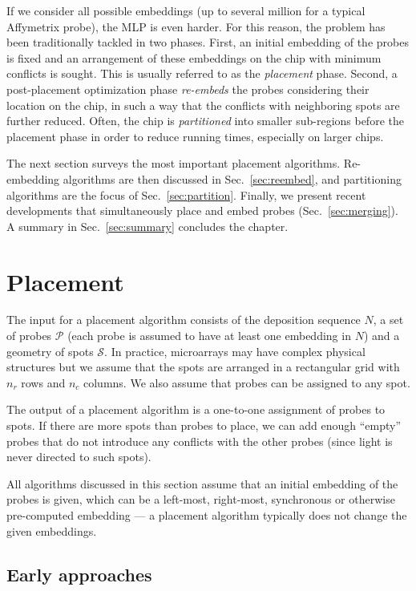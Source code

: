 \documentclass{w-edbk}
\begin{document}
If we consider all possible embeddings (up to several million for a typical
Affymetrix probe), the MLP is even harder. For this reason, the problem has
been traditionally tackled in two phases. First, an initial embedding of the
probes is fixed and an arrangement of these embeddings on the chip with minimum
conflicts is sought. This is usually referred to as the \emph{placement} phase.
Second, a post-placement optimization phase \emph{re-embeds} the probes
considering their location on the chip, in such a way that the conflicts with
neighboring spots are further reduced. Often, the chip is \emph{partitioned} 
into smaller sub-regions before the placement phase in order
to reduce running times, especially on larger chips.


The next section surveys the most important placement algorithms. Re-embedding
algorithms are then discussed in Sec.~\ref{sec:reembed}, and partitioning
algorithms are the focus of Sec.~\ref{sec:partition}. Finally, we present 
recent developments that simultaneously place and embed probes
(Sec.~\ref{sec:merging}). A summary in Sec.~\ref{sec:summary} concludes the
chapter.

\section{Placement}
\label{sec:placement}

The input for a placement algorithm consists of the deposition sequence $N$,
a set of probes $\mathcal{P}$ (each probe is assumed to have at least one
embedding in $N$) and a geometry of spots $\mathcal{S}$. In practice,
microarrays may have complex physical structures but we assume that the spots
are arranged in a rectangular grid with $n_r$ rows and $n_c$ columns. We also
assume that probes can be assigned to any spot.

The output of a placement algorithm is a one-to-one assignment of probes to
spots. If there are more spots than probes to place, we can add enough ``empty''
probes that do not introduce any conflicts with the other probes (since light
is never directed to such spots).

All algorithms discussed in this section assume that an initial embedding
of the probes is given, which can be a left-most, right-most, synchronous or
otherwise pre-computed embedding --- a placement algorithm typically does not
change the given embeddings.


\subsection{Early approaches}
\end{document}
